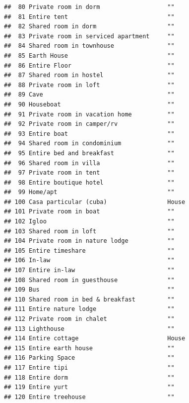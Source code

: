 \documentclass[]{article}
\begin{document}
\begin{verbatim}
##  80 Private room in dorm                   ""               
##  81 Entire tent                            ""               
##  82 Shared room in dorm                    ""               
##  83 Private room in serviced apartment     ""               
##  84 Shared room in townhouse               ""               
##  85 Earth House                            ""               
##  86 Entire Floor                           ""               
##  87 Shared room in hostel                  ""               
##  88 Private room in loft                   ""               
##  89 Cave                                   ""               
##  90 Houseboat                              ""               
##  91 Private room in vacation home          ""               
##  92 Private room in camper/rv              ""               
##  93 Entire boat                            ""               
##  94 Shared room in condominium             ""               
##  95 Entire bed and breakfast               ""               
##  96 Shared room in villa                   ""               
##  97 Private room in tent                   ""               
##  98 Entire boutique hotel                  ""               
##  99 Home/apt                               ""               
## 100 Casa particular (cuba)                 House            
## 101 Private room in boat                   ""               
## 102 Igloo                                  ""               
## 103 Shared room in loft                    ""               
## 104 Private room in nature lodge           ""               
## 105 Entire timeshare                       ""               
## 106 In-law                                 ""               
## 107 Entire in-law                          ""               
## 108 Shared room in guesthouse              ""               
## 109 Bus                                    ""               
## 110 Shared room in bed & breakfast         ""               
## 111 Entire nature lodge                    ""               
## 112 Private room in chalet                 ""               
## 113 Lighthouse                             ""               
## 114 Entire cottage                         House            
## 115 Entire earth house                     ""               
## 116 Parking Space                          ""               
## 117 Entire tipi                            ""               
## 118 Entire dorm                            ""               
## 119 Entire yurt                            ""               
## 120 Entire treehouse                       ""               

\end{verbatim}
\end{document}
